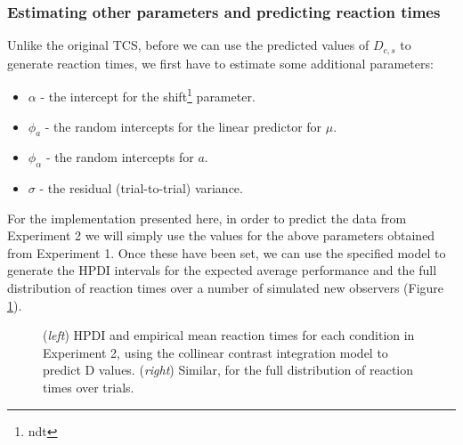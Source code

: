 \documentclass[smallextended, natbib]{svjour3}       %
\begin{document}
\subsubsection{Estimating other parameters and predicting reaction times}

Unlike the original TCS, before we can use the predicted values of $D_{c,s}$ to generate reaction times, we first have to estimate some additional parameters: 

\begin{itemize}	
\item $\alpha$ - the intercept for the shift\footnote{ndt} parameter.
\item $\phi_a$ - the random intercepts for the linear predictor for $\mu$.
\item $\phi_\alpha$ - the random intercepts for $a$.
\item $\sigma$ - the residual (trial-to-trial) variance. 
\end{itemize}

For the implementation presented here, in order to predict the data from Experiment 2 we will simply use the values for the above parameters obtained from Experiment 1. Once these have been set, we can use the specified model to generate the HPDI intervals for the expected average performance and the full distribution of reaction times over a number of simulated new observers (Figure \ref{fig:buetti2019_rt}).

\begin{figure}
\centering
{}
\caption{(\textit{left}) HPDI and empirical mean reaction times for each condition in Experiment 2, using the collinear contrast integration model to predict D values. (\textit{right}) Similar, for the full distribution of reaction times over trials. }
\label{fig:buetti2019_rt}
\end{figure}
\end{document}
